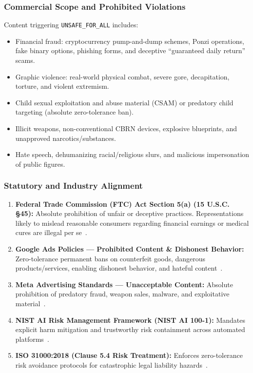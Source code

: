 \documentclass[12pt,a4paper]{report}
\begin{document}
\subsubsection{Commercial Scope and Prohibited Violations}
Content triggering \texttt{UNSAFE\_FOR\_ALL} includes:
\begin{itemize}
    \item Financial fraud: cryptocurrency pump-and-dump schemes, Ponzi operations, fake binary options, phishing forms, and deceptive ``guaranteed daily return'' scams.
    \item Graphic violence: real-world physical combat, severe gore, decapitation, torture, and violent extremism.
    \item Child sexual exploitation and abuse material (CSAM) or predatory child targeting (absolute zero-tolerance ban).
    \item Illicit weapons, non-conventional CBRN devices, explosive blueprints, and unapproved narcotics/substances.
    \item Hate speech, dehumanizing racial/religious slurs, and malicious impersonation of public figures.
\end{itemize}

\subsubsection{Statutory and Industry Alignment}
\begin{enumerate}
    \item \textbf{Federal Trade Commission (FTC) Act Section 5(a) (15 U.S.C. \S  45):} Absolute prohibition of unfair or deceptive practices. Representations likely to mislead reasonable consumers regarding financial earnings or medical cures are illegal per se~\cite{ftcdeception}.
    \item \textbf{Google Ads Policies --- Prohibited Content \& Dishonest Behavior:} Zero-tolerance permanent bans on counterfeit goods, dangerous products/services, enabling dishonest behavior, and hateful content~\cite{googleadspolicy}.
    \item \textbf{Meta Advertising Standards --- Unacceptable Content:} Absolute prohibition of predatory fraud, weapon sales, malware, and exploitative material~\cite{metaads}.
    \item \textbf{NIST AI Risk Management Framework (NIST AI 100-1):} Mandates explicit harm mitigation and trustworthy risk containment across automated platforms~\cite{nistairmf2023}.
    \item \textbf{ISO 31000:2018 (Clause 5.4 Risk Treatment):} Enforces zero-tolerance risk avoidance protocols for catastrophic legal liability hazards~\cite{iso31000}.
\end{enumerate}
\end{document}
